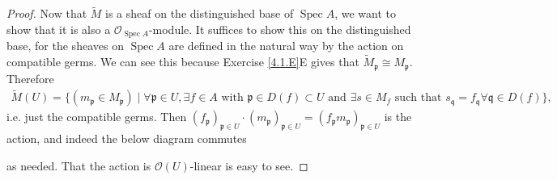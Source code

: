 \documentclass{article}
\newcommand{\fO}{\mathscr{O}}
\newcommand{\frkp}{\mathfrak{p}}
\newcommand{\frkq}{\mathfrak{q}}
\DeclareMathOperator{\Spec}{\mathrm{Spec}}
\begin{document}
\begin{proof}
    Now that $\widetilde M$ is a sheaf on the distinguished base of $\Spec A$, we want to show that it is also a $\fO_{\Spec A}$-module. It suffices to show this on the distinguished base, for the sheaves on $\Spec A$ are defined in the natural way by the action on compatible germs. We can see this because Exercise \ref{4.1.E}E gives that $\widetilde M_\frkp \cong M_\frkp$. Therefore
    \begin{align*}
        \widetilde M (U) = \{(m_\frkp \in M_\frkp) \mid \forall \frkp \in U, \exists f \in A \text{ with } \frkp \in D(f)\subset U \text{ and } \exists s \in M_f \text{ such that } s_\frkq = f_\frkq \forall \frkq \in D(f)\},
    \end{align*}
    i.e. just the compatible germs. Then $(f_\frkp)_{\frkp \in U} \cdot (m_\frkp)_{\frkp \in U} = (f_\frkp m_\frkp)_{\frkp \in U}$ is the action, and indeed the below diagram commutes
    \begin{center}
    \end{center}
    as needed. That the action is $\fO(U)$-linear is easy to see.
\end{proof}
\end{document}
